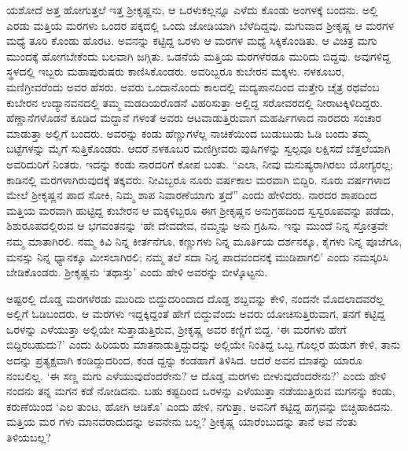 ಯಶೋದೆ ಅತ್ತ ಹೋಗುತ್ತಲೆ ಇತ್ತ ಶ್ರೀಕೃಷ್ಣನು, ಆ ಒರಳುಕಲ್ಲನ್ನೂ ಎಳೆದು ಕೊಂಡು ಅಂಗಳಕ್ಕೆ ಬಂದನು. ಅಲ್ಲಿ ಎರಡು ಮತ್ತಿಯ ಮರಗಳು ಒಂದರ ಪಕ್ಕದಲ್ಲಿ ಒಂದು ಜೋಡಿಯಾಗಿ ಬೆಳೆದಿದ್ದವು. ಮಗುವಾದ ಶ್ರೀಕೃಷ್ಣ ಆ ಮರಗಳ ಮಧ್ಯೆ ತೂರಿ ಕೊಂಡು ಹೊರಟ. ಅವನನ್ನು ಕಟ್ಟಿದ್ದ ಒರಳು ಆ ಮರಗಳ ಮಧ್ಯೆ ಸಿಕ್ಕಿಕೊಂಡಿತು. ಆ ವಿಚಿತ್ರ ಮಗು ಮುಂದಕ್ಕೆ ಹೋಗಬೇಕೆಂದು ಬಲವಾಗಿ ಜಗ್ಗಿತು. ಒಡನೆಯೆ ಮತ್ತಿಯ ಮರಗಳೆರಡೂ ಮುರಿದು ಬಿದ್ದವು. ಅವುಗಳಿದ್ದ ಸ್ಥಳದಲ್ಲಿ ಇಬ್ಬರು ಮಹಾಪುರುಷರು ಕಾಣಿಸಿಕೊಂಡರು. ಅವರಿಬ್ಬರೂ ಕುಬೇರನ ಮಕ್ಕಳು. ನಳಕೂಬರ, ಮಣಿಗ್ರೀವರೆಂದು ಅವರ ಹೆಸರು. ಅವರು ಒಂದಾನೊಂದು ಕಾಲದಲ್ಲಿ ಮದ್ಯಪಾನದಿಂದ ಮತ್ತೇರಿ ಚೈತ್ರ ರಥವೆಂಬ ಕುಬೇರನ ಉದ್ಯಾನವನದಲ್ಲಿ ತಮ್ಮ ಮಡದಿಯರೊಡನೆ ವಿಹರಿಸುತ್ತಾ ಅಲ್ಲಿದ್ದ ಸರೋವರದಲ್ಲಿ ನೀರಾಟಕ್ಕಿಳಿದಿದ್ದರು. ಹೆಣ್ಣಾನೆಗಳೊಡನೆ ಕೂಡಿದ ಮದ್ದಾನೆ ಗಳಂತೆ ಅವರು ಆಟವಾಡುತ್ತಿರುವಾಗ ಮಹರ್ಷಿಗಳಾದ ನಾರದರು ಸಂಚಾರ ಮಾಡುತ್ತಾ ಅಲ್ಲಿಗೆ ಬಂದರು. ಅವರನ್ನು ಕಂಡು ಹೆಣ್ಣುಗಳೆಲ್ಲ ನಾಚಿಕೆಯಿಂದ ಬುಡುಬುಡು ಓಡಿ ಬಂದು ತಮ್ಮ ಬಟ್ಟೆಗಳನ್ನು ಮೈಗೆ ಸುತ್ತಿಕೊಂಡರು. ಆದರೆ ನಳಕೂಬರ ಮಣಿಗ್ರೀವರು ಪುಷಿಗಳನ್ನು ಸ್ವಲ್ಪವೂ ಲಕ್ಷಿಸದೆ ಬೆತ್ತಲೆಯಾಗಿ ಅವರಿದುರಿಗೆ ನಿಂತರು. ಇದನ್ನು ಕಂಡು ನಾರದರಿಗೆ ಕೋಪ ಬಂತು. “ಎಲಾ, ನೀವು ಮನುಷ್ಯರಾಗಿರಲು ಯೋಗ್ಯರಲ್ಲ; ಕಾಡಿನಲ್ಲಿ ಮರಗಳಾಗಿರುವುದಕ್ಕೆ ತಕ್ಕವರು. ನೀವಿಬ್ಬರೂ ನೂರು ವರ್ಷಕಾಲ ಮರವಾಗಿ ಬಿದ್ದಿರಿ. ನೂರು ವರ್ಷಗಳಾದ ಮೇಲೆ ಶ್ರೀಕೃಷ್ಣನ ಪಾದ ಸೋಕಿ, ನಿಮ್ಮ ಶಾಪ ನಿವಾರಣೆಯಾಗು ತ್ತದೆ” ಎಂದು ಹೇಳಿದರು. ನಾರದರ ಶಾಪದಿಂದ ಮತ್ತಿಯ ಮರವಾಗಿ ಹುಟ್ಟಿದ್ದ ಕುಬೇರನ ಆ ಮಕ್ಕಳಿಬ್ಬರೂ ಈಗ ಶ್ರೀಕೃಷ್ಣನ ಅನುಗ್ರಹದಿಂದ ಸ್ವಸ್ವರೂಪವನ್ನು ಪಡೆದು, ಶಿಶುರೂಪದಲ್ಲಿರುವ ಆ ಭಗವಂತನನ್ನು ‘ಹೇ ದೇವದೇವ, ನಮ್ಮನ್ನು ಅನು ಗ್ರಹಿಸು. ಇನ್ನು ಮುಂದೆ ನಿನ್ನ ಸ್ತೋತ್ರವೇ ನಮ್ಮ ಮಾತಾಗಿರಲಿ. ನಮ್ಮ ಕಿವಿ ನಿನ್ನ ಕೀರ್ತನೆಗೂ, ಕಣ್ಣುಗಳು ನಿನ್ನ ಮೂರ್ತಿಯ ದರ್ಶನಕ್ಕೂ, ಕೈಗಳು ನಿನ್ನ ಪೂಜೆಗೂ, ಮನಸ್ಸು ನಿನ್ನ ಧ್ಯಾನಕ್ಕೂ ಮೀಸಲಾಗಿರಲಿ; ನಮ್ಮ ತಲೆ ಸದಾ ನಿನ್ನ ಪಾದವಂದನಕ್ಕೆ ಮುಡಿಪಾಗಲಿ’ ಎಂದು ನಮಸ್ಕರಿಸಿ ಬೇಡಿಕೊಂಡರು. ಶ್ರೀಕೃಷ್ಣನು ‘ತಥಾಸ್ತು’ ಎಂದು ಹೇಳಿ ಅವರನ್ನು ಬೀಳ್ಕೊಟ್ಟನು.

ಅಷ್ಟರಲ್ಲಿ ದೊಡ್ಡ ಮರಗಳೆರಡು ಮುರಿದು ಬಿದ್ದುದರಿಂದಾದ ದೊಡ್ಡ ಶಬ್ದವನ್ನು ಕೇಳಿ, ನಂದನೇ ಮೊದಲಾದವರೆಲ್ಲ ಅಲ್ಲಿಗೆ ಓಡಿಬಂದರು. ಆ ಮರಗಳು ಇದ್ದಕ್ಕಿದ್ದಂತೆ ಹೇಗೆ ಬಿದ್ದುವೆಂದು ಅವರು ಯೋಚಿಸುತ್ತಿರುವಾಗ, ತನಗೆ ಕಟ್ಟಿದ್ದ ಒರಳನ್ನು ಎಳೆಯುತ್ತಾ ಅಲ್ಲಿಯೇ ಸುತ್ತಾಡುತ್ತಿರುವ, ಶ್ರೀಕೃಷ್ಣ ಅವರ ಕಣ್ಣಿಗೆ ಬಿದ್ದ. ‘ಈ ಮರಗಳು ಹೇಗೆ ಬಿದ್ದಿರಬಹುದು?’ ಎಂದು ಹಿರಿಯರು ಮಾತನಾಡುತ್ತಿದ್ದುದನ್ನು ಅಲ್ಲಿಯೇ ನಿಂತಿದ್ದ ಒಬ್ಬ ಗೊಲ್ಲರ ಹುಡುಗ ಕೇಳಿ, ತಾನು ಅದನ್ನು ಪ್ರತ್ಯಕ್ಷವಾಗಿ ಕಂಡಿದ್ದುದರಿಂದ, ಕಂಡ ದ್ದನ್ನು ಕಂಡಹಾಗೆ ತಿಳಿಸಿದ. ಆದರೆ ಅವನ ಮಾತನ್ನು ಯಾರೂ ನಂಬಲಿಲ್ಲ. ‘ಈ ಸಣ್ಣ ಮಗು ಎಳೆಯುವುದೆಂದರೇನು? ಆ ದೊಡ್ಡ ಮರಗಳು ಬೀಳುವುದೆಂದರೇನು?’ ಎಂದು ಹೇಳಿ ನಂದನು ತನ್ನ ಮಗನ ಕಡೆ ನೋಡಿದನು. ಬಹು ಕಷ್ಟದಿಂದ ಒರಳನ್ನು ಎಳೆಯುತ್ತಾ ನಡೆಯುತ್ತಿರುವ ಮಗನನ್ನು ಕಂಡು, ಕರುಣೆಯಿಂದ ‘ಎಲ ತುಂಟ, ಹೋಗಿ ಆಡಿಕೊ’ ಎಂದು ಹೇಳಿ, ನಗುತ್ತಾ, ಅವನಿಗೆ ಕಟ್ಟಿದ್ದ ಹಗ್ಗವನ್ನು ಬಿಚ್ಚಿಹಾಕಿದನು. ಮತ್ತಿಯ ಮರ ಗಳು ಮಾನವರಾದುದನ್ನು ಅವನೇನು ಬಲ್ಲ? ಶ್ರೀಕೃಷ್ಣ ಯಾರೆಂಬುದನ್ನು ತಾನೆ ಅವ ನೆಂತು ತಿಳಿಯಬಲ್ಲ?

